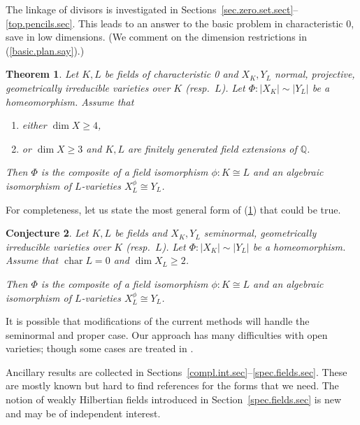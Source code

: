 \documentclass{amsart}
\newtheorem{thm}{Theorem}%
\newtheorem{conj}[thm]{Conjecture}
\theoremstyle{definition}
\theoremstyle{remark}
\newcommand{\q}[0]{{\mathbb Q}}
\newcommand{\chr}[0]{\operatorname{char}}
\begin{document}
The linkage of divisors is investigated in 
Sections~\ref{sec.zero.set.sect}--\ref{top.pencils.sec}.  This leads to an  answer to the basic problem in characteristic 0, save in low dimensions.
(We comment on the dimension restrictions in (\ref{basic.plan.say}).) 



\begin{thm}\label{home.iso.thm}
 Let $K, L$ be   fields of characteristic 0  and $X_K, Y_L$   normal, projective, geometrically irreducible  varieties 
over $K$  (resp.\ $L$). Let
$\Phi:|X_K|\sim |Y_L|$ be a homeomorphism.  Assume that 
\begin{enumerate}
\item either $\dim X\geq 4$,
\item or $\dim X\geq 3$ and  $K, L$ are   finitely generated  field extensions of $\q$.
\end{enumerate}
Then $\Phi$ is the composite of  a field isomorphism  $\phi:K\cong L$ and an algebraic isomorphism of $L$-varieties $X_L^{\phi}\cong Y_L$. 
\end{thm}


For completeness, let us state the most general form of (\ref{home.iso.thm})  that could be true.

\begin{conj}\label{home.iso.conj}
 Let $K, L$ be   fields    and $X_K, Y_L$   seminormal,  geometrically irreducible  varieties 
over $K$  (resp.\ $L$). Let
$\Phi:|X_K|\sim |Y_L|$ be a homeomorphism. 
Assume that $\chr L=0$  and $\dim X_L\geq 2$.

Then $\Phi$ is the composite of  a field isomorphism  $\phi:K\cong L$ and an algebraic isomorphism of $L$-varieties $X_L^{\phi}\cong Y_L$. 
\end{conj}


It is possible that  modifications of the current methods will handle the seminormal and  proper case. Our approach has many difficulties with open varieties; though some cases are treated in \cite{k-lo, k-lo-2}.  
\medskip


Ancillary results are collected in Sections~\ref{compl.int.sec}--\ref{spec.fields.sec}. These are mostly known but hard to find references  for the forms that we need. The notion of weakly Hilbertian fields introduced in Section~\ref{spec.fields.sec}
is new and may be of independent interest. 
\end{document}
